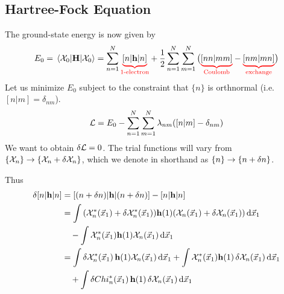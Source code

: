 \documentclass[12pt,a4paper,titlepage]{article}
\newcommand{\trm}[1]{\textrm{#1}} %
\newcommand{\Chi}{\mathcal{X}} %
\begin{document}
\subsection{Hartree-Fock Equation}
The ground-state energy is now given by
\begin{equation}
E_{0}=\mel{\Chi_{0}}{\vb{H}}{\Chi_{0}}=\sum_{n=1}^{N}{\color{red}\underbrace{\color{black}[n|\vb{h}|n]}_{\trm{1-electron}}}+\frac{1}{2}\sum_{n=1}^{N}\sum_{m=1}^{N}\big({\color{red}\underbrace{\color{black}[nn|mm]}_{\trm{Coulomb}}}-{\color{red}\underbrace{\color{black}[nm|mn]}_{\trm{exchange}}}\big)
\end{equation}
Let us minimize $E_{0}$ subject to the constraint that $\{n\}$ is orthnormal (i.e. $[n|m]=\delta_{nm}$).
\begin{equation}
\mathcal{L}=E_{0}-\sum_{n=1}^{N}\sum_{m=1}^{N}\lambda_{nm}\qty([n|m]-\delta_{nm})
\end{equation}
We want to obtain $\var{\mathcal{L}}=0$. The trial functions will vary from $\{\Chi_{n}\}\rightarrow\{\Chi_{n}+\var{\Chi_{n}}\}$, which we denote in shorthand as $\{n\}\rightarrow\{n+\var{n}\}$.
\begin{center}
\end{center}
Thus
\begin{equation}
\begin{aligned}
\var{[n|\vb{h}|n]}&=[(n+\var{n})|\vb{h}|(n+\var{n})]-[n|\vb{h}|n]\\
&=\int\qty(\Chi_{n}^{*}(\vec{x}_{1})+\var{\Chi_{n}^{*}(\vec{x}_{1})})\vb{h}(1)\qty(\Chi_{n}(\vec{x}_{1})+\var{\Chi_{n}(\vec{x}_{1})})\dd{\vec{x}_{1}}\\
&\quad-\int\Chi_{n}^{*}(\vec{x}_{1})\vb{h}(1)\Chi_{n}(\vec{x}_{1})\dd{\vec{x}_{1}}\\
&=\int\var{\Chi_{n}^{*}(\vec{x}_{1})}\vb{h}(1)\Chi_{n}(\vec{x}_{1})\dd{\vec{x}_{1}}+\int\Chi_{n}^{*}(\vec{x}_{1})\vb{h}(1)\var{\Chi_{n}(\vec{x}_{1})}\dd{\vec{x}_{1}}\\
&\quad+\int\var{Chi_{n}^{*}(\vec{x}_{1})}\vb{h}(1)\var{\Chi_{n}(\vec{x}_{1})}\dd{\vec{x}_{1}}
\end{aligned}
\end{equation}
\end{document}
